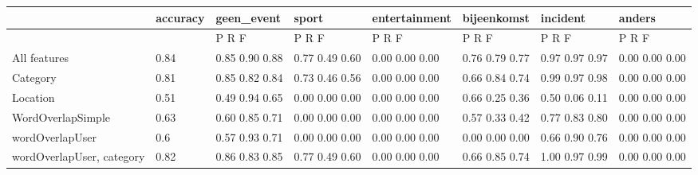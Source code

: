 \documentclass[
10pt, %
a4paper, %
oneside, %
headinclude,footinclude, %
BCOR5mm, %
]{scrartcl}
\begin{document}
\begin{landscape}
\begin{table}[h]
\begin{tabular}{|l|l|l|l|l|l|l|l|}
\hline
                          & accuracy & geen\_event    & sport          & entertainment  & bijeenkomst    & incident       & anders         \\ \hline
                          &          & P    R    F    & P    R    F    & P    R    F    & P    R    F    & P    R    F    & P    R    F    \\ \hline
All features              & 0.84     & 0.85 0.90 0.88 & 0.77 0.49 0.60 & 0.00 0.00 0.00 & 0.76 0.79 0.77 & 0.97 0.97 0.97 & 0.00 0.00 0.00 \\ \hline
Category                  & 0.81     & 0.85 0.82 0.84 & 0.73 0.46 0.56 & 0.00 0.00 0.00 & 0.66 0.84 0.74 & 0.99 0.97 0.98 & 0.00 0.00 0.00 \\ \hline
Location                  & 0.51     & 0.49 0.94 0.65 & 0.00 0.00 0.00 & 0.00 0.00 0.00 & 0.66 0.25 0.36 & 0.50 0.06 0.11 & 0.00 0.00 0.00 \\ \hline
WordOverlapSimple         & 0.63     & 0.60 0.85 0.71 & 0.00 0.00 0.00 & 0.00 0.00 0.00 & 0.57 0.33 0.42 & 0.77 0.83 0.80 & 0.00 0.00 0.00 \\ \hline
wordOverlapUser           & 0.6      & 0.57 0.93 0.71 & 0.00 0.00 0.00 & 0.00 0.00 0.00 & 0.00 0.00 0.00 & 0.66 0.90 0.76 & 0.00 0.00 0.00 \\ \hline
wordOverlapUser, category & 0.82     & 0.86 0.83 0.85 & 0.77 0.49 0.60 & 0.00 0.00 0.00 & 0.66 0.85 0.74 & 1.00 0.97 0.99 & 0.00 0.00 0.00 \\ \hline
\end{tabular}
\end{table}
\end{landscape}


\end{document}
